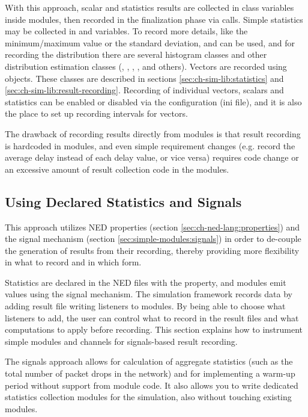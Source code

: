 With this approach, scalar and statistics results are collected in class
variables inside modules, then recorded in the finalization phase via
 calls. Simple statistics may be collected in
 and  variables. To record more details, like the
minimum/maximum value or the standard deviation,  and
 can be used, and for recording the distribution
there are several histogram classes and other distribution estimation
classes (, ,
, , and others). Vectors are recorded
using  objects. These classes are described in sections
\ref{sec:ch-sim-lib:statistics} and \ref{sec:ch-sim-lib:result-recording}.
Recording of individual vectors, scalars and statistics can be enabled or
disabled via the configuration (ini file), and it is also the place to set
up recording intervals for vectors.

The drawback of recording results directly from modules is that result
recording is hardcoded in modules, and even simple requirement changes
(e.g. record the average delay instead of each delay value, or vice versa)
requires code change or an excessive amount of result collection code
in the modules.

\subsection{Using Declared Statistics and Signals}

This approach utilizes NED properties (section
\ref{sec:ch-ned-lang:properties}) and the signal mechanism (section
\ref{sec:simple-modules:signals}) in order to de-couple the generation of
results from their recording, thereby providing more flexibility in what to
record and in which form.

Statistics are declared in the NED files with the  property,
and modules emit values using the signal mechanism. The simulation
framework records data by adding result file writing listeners to modules.
By being able to choose what listeners to add, the user can control what to
record in the result files and what computations to apply before recording.
This section \label{sec:ch-simple-modules:statistic-signals} explains how to
instrument simple modules and channels for signals-based result recording.

The signals approach allows for calculation of aggregate statistics (such as the
total number of packet drops in the network) and for implementing a warm-up
period without support from module code. It also allows you to write
dedicated statistics collection modules for the simulation, also without
touching existing modules.

